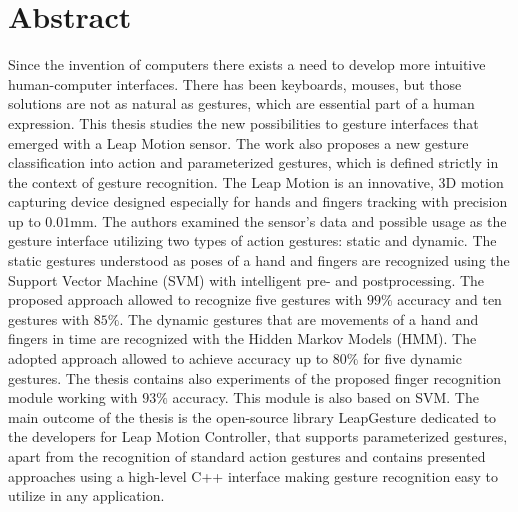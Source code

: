\chapter{Abstract}
Since the invention of computers there exists a need to develop more intuitive human-computer interfaces.
There has been keyboards, mouses, but those solutions are not as natural as gestures, which are essential part of a human expression.
This thesis studies the new possibilities to gesture interfaces that emerged with a Leap Motion sensor.
The work also proposes a new gesture classification into action and parameterized gestures, which is defined strictly in the context of gesture recognition.
The Leap Motion is an innovative, 3D motion capturing device designed especially for hands and fingers tracking with precision up to $0.01$mm.
The authors examined the sensor's data and possible usage as the gesture interface utilizing two types of action gestures: static and dynamic.
The static gestures understood as poses of a hand and fingers are recognized using the Support Vector Machine (SVM) with intelligent pre- and postprocessing.
The proposed approach allowed to recognize five gestures with $99\%$ accuracy and ten gestures with $85\%$.
The dynamic gestures that are movements of a hand and fingers in time are recognized with the Hidden Markov Models (HMM). 
The adopted approach allowed to achieve accuracy up to $80\%$ for five dynamic gestures.
The thesis contains also experiments of the proposed finger recognition module working with $93\%$ accuracy. This module is also based on SVM.
The main outcome of the thesis is the open-source library LeapGesture dedicated to the developers for Leap Motion Controller, that supports parameterized gestures, apart from the recognition of standard action gestures and contains presented approaches using a high-level C++ interface making gesture recognition easy to utilize in any application.